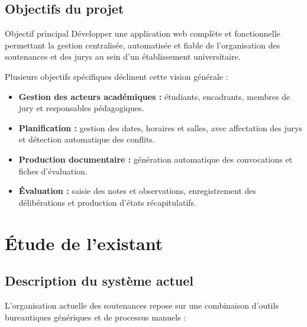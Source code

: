 \documentclass[12pt,a4paper]{article}
\begin{document}
\subsection{Objectifs du projet}
\label{subsec:objectifs}

\begin{projectbox}{Objectif principal}
    Développer une application web complète et fonctionnelle permettant la
    gestion centralisée, automatisée et fiable de l'organisation des soutenances
    et des jurys au sein d'un établissement universitaire.
\end{projectbox}

Plusieurs objectifs spécifiques déclinent cette vision générale :

\begin{itemize}[label=\textcolor{primary}{\textbullet}]
    \item \textbf{Gestion des acteurs académiques :} étudiants, encadrants,
          membres de jury et responsables pédagogiques.
    \item \textbf{Planification :} gestion des dates, horaires et salles, avec
          affectation des jurys et détection automatique des conflits.
    \item \textbf{Production documentaire :} génération automatique des
          convocations et fiches d'évaluation.
    \item \textbf{Évaluation :} saisie des notes et observations, enregistrement
          des délibérations et production d'états récapitulatifs.
\end{itemize}

\section{Étude de l'existant}
\label{sec:existant}

\subsection{Description du système actuel}
\label{subsec:systeme_actuel}

L'organisation actuelle des soutenances repose sur une combinaison d'outils
bureautiques génériques et de processus manuels :
\end{document}
